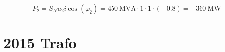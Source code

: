 \documentclass[11pt,a4paper]{scrartcl}
\newcommand{\mybr}[1]{\left(#1\right)}
\newcommand{\0}{_{\mybr{0}}}
\newcommand{\1}{_{\mybr{1}}}
\newcommand{\2}{_{\mybr{2}}}
\newcommand{\cz}{\cos\mybr{\varphi_2}}
\begin{document}
\subsection{}
\begin{equation}
P_2=S_N u_2 i \cz=\SI{450}{\mega\volt\ampere}\cdot\num{1}\cdot\num{1}\cdot\mybr{\num{-0.8}}=\SI{-360}{\mega\watt}
\end{equation}

\clearpage
\part{2015 Trafo}
\section{}
\end{document}
